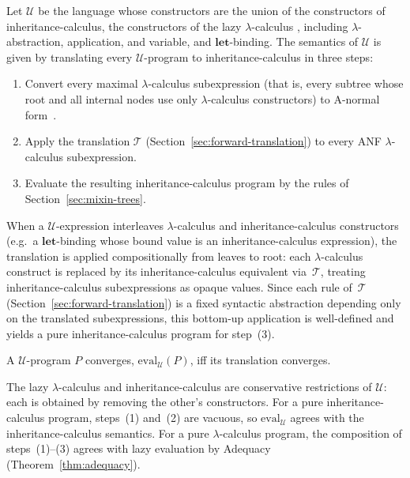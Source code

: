 \begin{definition}
  \label{def:language-universe}
  Let $\mathscr{U}$ be the language whose constructors are
  the union of the constructors of inheritance-calculus,
  the constructors of the lazy $\lambda$-calculus
  , including $\lambda$-abstraction, application, and variable, and
  $\mathbf{let}$-binding.
  The semantics of $\mathscr{U}$ is given by translating
  every $\mathscr{U}$-program to inheritance-calculus in
  three steps:
  \begin{enumerate}
    \item Convert every maximal $\lambda$-calculus
      subexpression (that is, every subtree whose root
        and all internal nodes use only $\lambda$-calculus
      constructors) to A-normal
      form~\cite{flanagan1993-essence-compiling-continuations}.
    \item Apply the translation $\mathcal{T}$
      (Section~\ref{sec:forward-translation}) to every ANF
      $\lambda$-calculus subexpression.
    \item Evaluate the resulting inheritance-calculus
      program by the rules of
      Section~\ref{sec:mixin-trees}.
  \end{enumerate}
  When a $\mathscr{U}$-expression interleaves
  $\lambda$-calculus and inheritance-calculus constructors
  (e.g.\ a $\mathbf{let}$-binding whose bound value is an
  inheritance-calculus expression), the translation is
  applied compositionally from leaves to root: each
  $\lambda$-calculus construct is replaced by its
  inheritance-calculus equivalent via~$\mathcal{T}$,
  treating inheritance-calculus subexpressions as opaque
  values.
  Since each rule of~$\mathcal{T}$
  (Section~\ref{sec:forward-translation}) is a fixed
  syntactic abstraction depending only on the translated
  subexpressions, this bottom-up application is
  well-defined and yields a pure inheritance-calculus
  program for step~(3).

  A $\mathscr{U}$-program $P$ converges,
  $\mathrm{eval}_{\mathscr{U}}(P)$, iff its translation
  converges.
\end{definition}

\begin{remark}\label{rem:universe-properties}
  The lazy $\lambda$-calculus and inheritance-calculus are
  conservative restrictions of $\mathscr{U}$: each is
  obtained by removing the other's constructors.
  For a pure inheritance-calculus program, steps~(1)
  and~(2) are vacuous, so
  $\mathrm{eval}_{\mathscr{U}}$ agrees with the
  inheritance-calculus semantics.
  For a pure $\lambda$-calculus program, the composition
  of steps~(1)--(3) agrees with lazy evaluation by
  Adequacy (Theorem~\ref{thm:adequacy}).
\end{remark}

